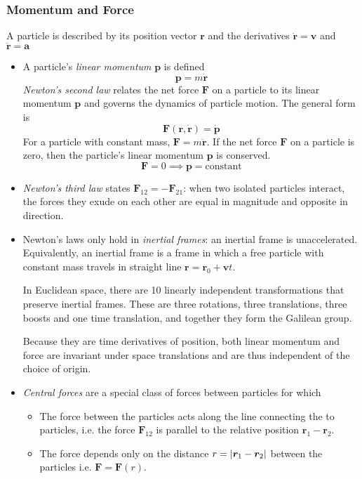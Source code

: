 \documentclass[11pt, a4paper]{article}
\newcommand{\bdot}[1]{\dot{\bm{#1}}}
\newcommand{\bddot}[1]{\ddot{\bm{#1}}}
\begin{document}
\subsubsection{Momentum and Force}
A particle is described by its position vector $ \bm{r} $ and the derivatives $ \bdot{r} = \bm{v}$ and $ \bddot{r} = \bm{a}$
\begin{itemize}
	\item A particle's \textit{linear momentum} $ \bm{p} $ is defined
	\begin{equation*}
		\bm{p} = m \bdot{r}
	\end{equation*}
	\textit{Newton's second law} relates the net force $ \bm{F} $ on a particle to its linear momentum $ \bm{p} $ and governs the dynamics of particle motion. The general form is
	\begin{equation*}
		\bm{F}(\bm{r}, \dot{\bm{r}}) = \bdot{p}
	\end{equation*}
	For a particle with constant mass, $ \bm{F} = m \ddot{\bm{r}} $. If the net force $ \bm{F} $ on a particle is zero, then the particle's linear momentum $ \bm{p} $ is conserved. 
	\begin{equation*}
		\bm{F} = 0 \implies \bm{p} = \text{constant} 
	\end{equation*}
	
	\item \textit{Newton's third law} states $ \bm{F}_{12} = - \bm{F}_{21} $: when two isolated particles interact, the forces they exude on each other are equal in magnitude and opposite in direction.
	
	\item Newton's laws only hold in \textit{inertial frames}: an inertial frame is unaccelerated. Equivalently, an inertial frame is a frame in which a free particle with constant mass travels in straight line $ \bm{r} = \bm{r}_0 + \bm{v}t $.
		
	In Euclidean space, there are 10 linearly independent transformations that preserve inertial frames. These are three rotations, three translations, three boosts and one time translation, and together they form the Galilean group.
	
	Because they are time derivatives of position, both linear momentum and force are invariant under space translations and are thus independent of the choice of origin.
	
	\item \textit{Central forces} are a special class of forces between particles for which
	\begin{itemize}
		\item The force between the particles acts along the line connecting the to particles, i.e. the force $ \bm{F}_{12} $ is parallel to the relative position $ \bm{r}_{1} - \bm{r}_{2} $.
		
		\item The force depends only on the distance $ r = \abs{\bm{r}_{1} - \bm{r}_{2}} $ between the particles i.e. $ \bm{F} = \bm{F}(r) $.
		
	\end{itemize}
\end{itemize}
\end{document}
